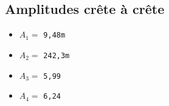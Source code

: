    \subsection{Amplitudes crête à crête}
    \begin{itemize}
     \item $A_1 =$ \verb|9,48m| \volt
     \item $A_2 =$ \verb|242,3m| \volt
     \item $A_3 =$ \verb|5,99| \volt
     \item $A_4 =$ \verb|6,24| \volt
    \end{itemize}
